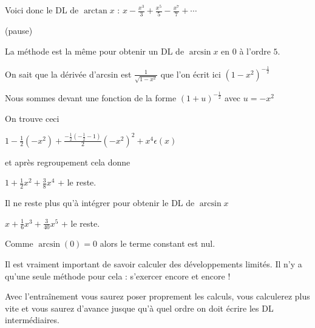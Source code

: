 \change

Voici donc le DL de $\arctan x$ :
$x-\frac{x^3}{3}+\frac{x^5}{5}-\frac{x^7}{7} +\cdots$

(pause)

\change

La méthode est la même pour obtenir un DL de $\arcsin x$ en $0$ à l'ordre $5$.

\change

On sait que la dérivée d'arcsin est $\frac{1}{\sqrt{1-x^2}}$
que l'on écrit ici $(1-x^2)^{-\frac{1}{2}}$

\change

Nous sommes devant une fonction de la forme $(1+u)^{-\frac12}$ avec $u=-x^2$

On trouve ceci

$1-\frac{1}{2}(-x^2)
+\frac{-\frac{1}{2}(-\frac{1}{2}-1)}{2}(-x^2)^2+x^4\epsilon(x) $

\change

et après regroupement cela donne

$1+\frac{1}{2}x^2 + \frac{3}{8}x^4$ + le reste.

\change

Il ne reste plus qu'à intégrer
pour obtenir le DL de $\arcsin x$

$x+\frac{1}{6}x^3+\frac{3}{40}x^5$ + le reste. 

Comme $\arcsin(0)=0$ alors le terme constant est nul.

\diapo

Il est vraiment important de savoir calculer des développements limités.
Il n'y a qu'une seule méthode pour cela : s’exercer encore et encore !

Avec l’entraînement vous saurez poser proprement les calculs,
vous calculerez plus vite et vous saurez d'avance jusque 
qu'à quel ordre on doit écrire les DL intermédiaires.




